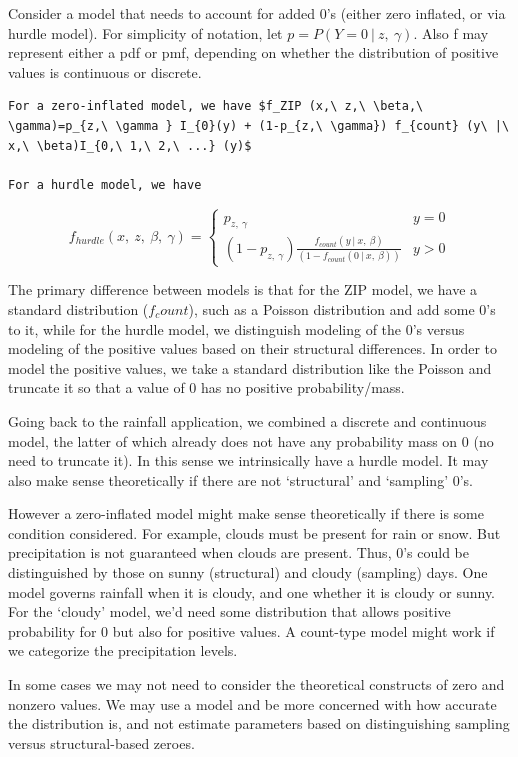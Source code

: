 \documentclass[
  9pt,
  ignorenonframetext,
]{beamer}
\begin{document}
\begin{frame}[fragile]{}
\protect\hypertarget{section-16}{}
Consider a model that needs to account for added 0's (either zero
inflated, or via hurdle model). For simplicity of notation, let
\(p=P(Y=0\ |\ z,\ \gamma)\). Also f may represent either a pdf or pmf,
depending on whether the distribution of positive values is continuous
or discrete.

\begin{verbatim}
For a zero-inflated model, we have $f_ZIP (x,\ z,\ \beta,\ \gamma)=p_{z,\ \gamma } I_{0}(y) + (1-p_{z,\ \gamma}) f_{count} (y\ |\ x,\ \beta)I_{0,\ 1,\ 2,\ ...} (y)$

For a hurdle model, we have 
\end{verbatim}

\[
f_{hurdle} (x,\ z,\ \beta,\ \gamma)=
\begin{cases}
p_{z,\ \gamma} &  y=0 \\ 
(1-p_{z,\ \gamma}) \frac {f_{count} (y\ |\ x,\ \beta)} {(1-f_{count} (0\ |\ x,\ \beta))} & y>0
\end{cases}
\]
\end{frame}

\begin{frame}{}
\protect\hypertarget{section-17}{}
The primary difference between models is that for the ZIP model, we have
a standard distribution (\(f_count\)), such as a Poisson distribution
and add some 0's to it, while for the hurdle model, we distinguish
modeling of the 0's versus modeling of the positive values based on
their structural differences. In order to model the positive values, we
take a standard distribution like the Poisson and truncate it so that a
value of 0 has no positive probability/mass.

Going back to the rainfall application, we combined a discrete and
continuous model, the latter of which already does not have any
probability mass on 0 (no need to truncate it). In this sense we
intrinsically have a hurdle model. It may also make sense theoretically
if there are not `structural' and `sampling' 0's.
\end{frame}

\begin{frame}{}
\protect\hypertarget{section-18}{}
However a zero-inflated model might make sense theoretically if there is
some condition considered. For example, clouds must be present for rain
or snow. But precipitation is not guaranteed when clouds are present.
Thus, 0's could be distinguished by those on sunny (structural) and
cloudy (sampling) days. One model governs rainfall when it is cloudy,
and one whether it is cloudy or sunny. For the `cloudy' model, we'd need
some distribution that allows positive probability for 0 but also for
positive values. A count-type model might work if we categorize the
precipitation levels.

In some cases we may not need to consider the theoretical constructs of
zero and nonzero values. We may use a model and be more concerned with
how accurate the distribution is, and not estimate parameters based on
distinguishing sampling versus structural-based zeroes.
\end{frame}
\end{document}

